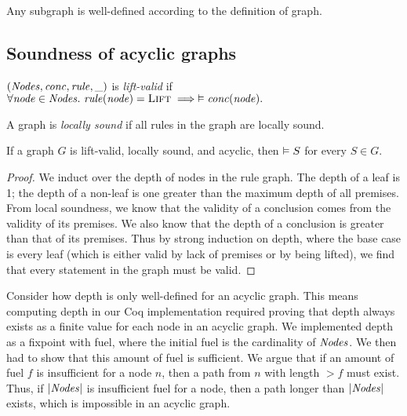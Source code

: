 \begin{lemma}
Any subgraph is well-defined according to the definition of graph.
\end{lemma}
\fi

\subsection{Soundness of acyclic graphs}

\begin{definition}
$(\mathit{Nodes},\mathit{conc},\mathit{rule},\_)$ is \emph{lift-valid}
if
\(
    \forall \mathit{node} \in \mathit{Nodes}.\ \mathit{rule}(\mathit{node}) = \textsc{Lift} \implies
    \vDash \mathit{conc}(\mathit{node}).
\)
\end{definition}

\begin{definition}
    A graph is \emph{locally sound} if
    all rules in the graph are locally sound.
\end{definition}

\begin{lemma}
    \label{lem:acyclic-soundness}
    If a graph $G$ is lift-valid, locally sound, and acyclic,
    then $\vDash S$ for every $S \in G$.
\end{lemma}

\begin{proof}
We induct over the depth of nodes in the rule graph.
The depth of a leaf is 1;
the depth of a non-leaf is one greater than the maximum depth of all premises.
From local soundness, we know that the validity of a conclusion
comes from the validity of its premises. 
We also know that the depth of a conclusion is greater than that of its premises.
Thus by strong induction on depth,
where the base case is every leaf
(which is either valid by lack of premises or by being lifted),
we find that every statement in the graph must be valid.

\end{proof}

Consider how depth is only well-defined for an acyclic graph.
This means computing depth in our Coq implementation required
proving that depth always exists as a finite value for each node in an acyclic graph.
We implemented depth as a fixpoint with fuel, where the initial fuel is the cardinality of $\mathit{Nodes}$.
We then had to show that this amount of fuel is sufficient. We argue that if an amount of fuel $f$ is insufficient for a node $n$,
then a path from $n$ with length $> f$ must exist.
Thus, if $\left|\mathit{Nodes}\right|$ is insufficient fuel for a node,
then a path longer than $\left|\mathit{Nodes}\right|$ exists,
which is impossible in an acyclic graph.

